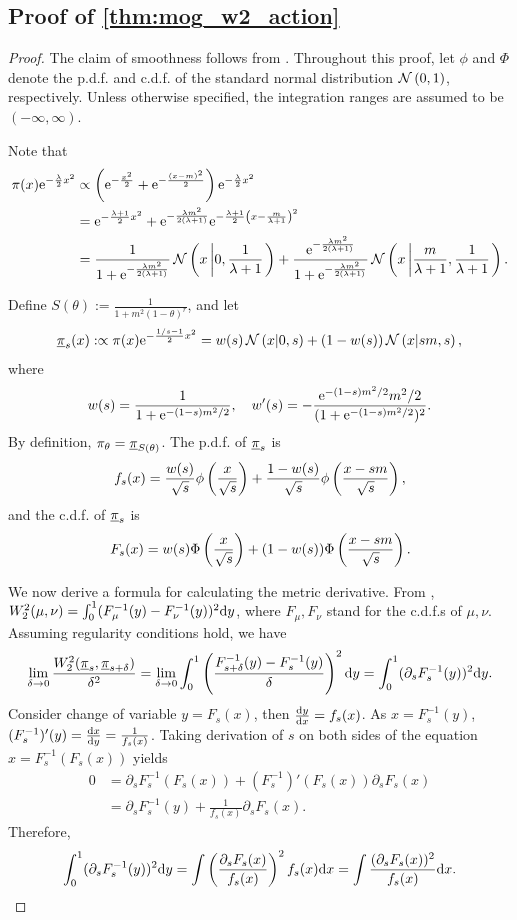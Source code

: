 \subsection{Proof of \cref{thm:mog_w2_action}}
\label{app:prf:mog_w2_action}
\begin{proof}
The claim of smoothness follows from \citet[Lem. 7]{guo2025provable}. Throughout this proof, let $\phi$ and $\Phi$ denote the p.d.f. and c.d.f. of the standard normal distribution $\operatorname{\mathcal{N}}\left(0,1\right)$, respectively. Unless otherwise specified, the integration ranges are assumed to be $(-\infty,\infty)$.

Note that 
\begin{align*}
    \pi(x)\mathrm{e}^{-\frac{\lambda}{2}x^2}&\propto\left(\mathrm{e}^{-\frac{x^2}{2}}+\mathrm{e}^{-\frac{(x-m)^2}{2}}\right)\mathrm{e}^{-\frac{\lambda}{2}x^2}\\
    &=\mathrm{e}^{-\frac{\lambda+1}{2}x^2}+\mathrm{e}^{-\frac{\lambda m^2}{2(\lambda+1)}}\mathrm{e}^{-\frac{\lambda+1}{2}\left(x-\frac{m}{\lambda+1}\right)^2}\\
    &=\frac{1}{1+\mathrm{e}^{-\frac{\lambda m^2}{2(\lambda+1)}}}\operatorname{\mathcal{N}}\left(x\left|0,\frac{1}{\lambda+1}\right.\right)+\frac{\mathrm{e}^{-\frac{\lambda m^2}{2(\lambda+1)}}}{1+\mathrm{e}^{-\frac{\lambda m^2}{2(\lambda+1)}}}\operatorname{\mathcal{N}}\left(x\left|\frac{m}{\lambda+1},\frac{1}{\lambda+1}\right.\right).
\end{align*}

Define $S(\theta):=\frac{1}{1+m^2(1-\theta)^r}$, and let 
\begin{align*}
    \underline{\pi}_s(x):\propto\pi(x)\mathrm{e}^{-\frac{1/s-1}{2}x^2}=w(s)\operatorname{\mathcal{N}}\left(x|0,s\right)+(1-w(s))\operatorname{\mathcal{N}}\left(x|sm,s\right),    
\end{align*}
where
$$w(s)=\frac{1}{1+\mathrm{e}^{-(1-s)m^2/2}},\quad w'(s)=-\frac{\mathrm{e}^{-(1-s)m^2/2}m^2/2}{(1+\mathrm{e}^{-(1-s)m^2/2})^2}.$$
By definition, $\pi_\theta=\underline{\pi}_{S(\theta)}$. The p.d.f. of $\underline{\pi}_s$ is 
$$f_s(x)=\frac{w(s)}{\sqrt{s}}\phi\left(\frac{x}{\sqrt{s}}\right)+\frac{1-w(s)}{\sqrt{s}}\phi\left(\frac{x-sm}{\sqrt{s}}\right),$$
and the c.d.f. of $\underline{\pi}_s$ is 
$$F_s(x)=w(s)\Phi\left(\frac{x}{\sqrt{s}}\right)+(1-w(s))\Phi\left(\frac{x-sm}{\sqrt{s}}\right).$$

We now derive a formula for calculating the metric derivative. From \citet[Thm. 2.18]{villani2021topics}, $W_2^2(\mu,\nu)=\int_0^1(F_\mu^{-1}(y)-F_\nu^{-1}(y))^2\mathrm{d} y$, where $F_\mu,F_\nu$ stand for the c.d.f.s of $\mu,\nu$. Assuming regularity conditions hold, we have
$$\lim_{\delta\to0}\frac{W_2^2(\underline{\pi}_s,\underline{\pi}_{s+\delta})}{\delta^2}=\lim_{\delta\to0}\int_0^1\left(\frac{F_{s+\delta}^{-1}(y)-F_s^{-1}(y)}{\delta}\right)^2\mathrm{d} y=\int_0^1(\partial_sF^{-1}_s(y))^2\mathrm{d} y.$$
Consider change of variable $y=F_s(x)$, then $\frac{\mathrm{d}y}{\mathrm{d}x}=f_s(x)$. As $x=F_s^{-1}(y)$, $(F_s^{-1})'(y)=\frac{\mathrm{d}x}{\mathrm{d}y}=\frac{1}{f_s(x)}$. Taking derivation of $s$ on both sides of the equation $x=F_s^{-1}(F_s(x))$ yields 
\begin{align*}
    0&=\partial_sF_s^{-1}(F_s(x))+(F_s^{-1})'(F_s(x))\partial_sF_s(x)\\
    &=\partial_sF_s^{-1}(y)+\frac{1}{f_s(x)}\partial_sF_s(x).
\end{align*}
Therefore,
\begin{align*}
    \int_0^1(\partial_sF^{-1}_s(y))^2\mathrm{d} y=\int\left(\frac{\partial_sF_s(x)}{f_s(x)}\right)^2f_s(x)\mathrm{d} x=\int\frac{(\partial_sF_s(x))^2}{f_s(x)}\mathrm{d} x.
\end{align*}


\end{proof}
